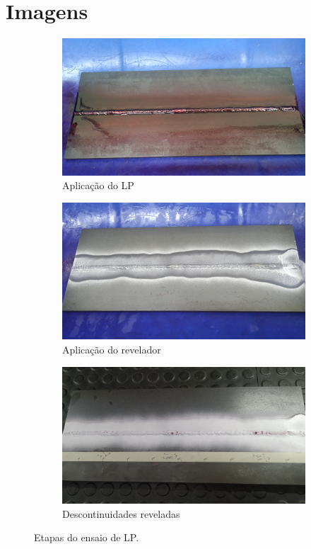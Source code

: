 \documentclass[12pt,oneside]{article}
\begin{document}
\section{Imagens}
\begin{figure}[h!]
    \begin{subfigure}{0.49\textwidth}
        \centering
        \includegraphics[width=0.65\linewidth]{figuras/aplicacao}
        \caption{Aplicação do LP}
        \label{fig:aplicação-lp}
    \end{subfigure}
    \begin{subfigure}{.5\textwidth}
        \centering
        \includegraphics[width=0.65\linewidth]{figuras/aplicacao2}
        \caption{Aplicação do revelador}
        \label{fig:aplicação-revelador}
    \end{subfigure}
    \begin{subfigure}{\textwidth}
        \centering
        \includegraphics[width=0.82\linewidth]{figuras/aplicacao3}
        \caption{Descontinuidades reveladas}
        \label{fig:fig1-descontinuidades}
    \end{subfigure}
    \caption{Etapas do ensaio de LP.}
    \label{fig:fig1}
\end{figure}
\end{document}
